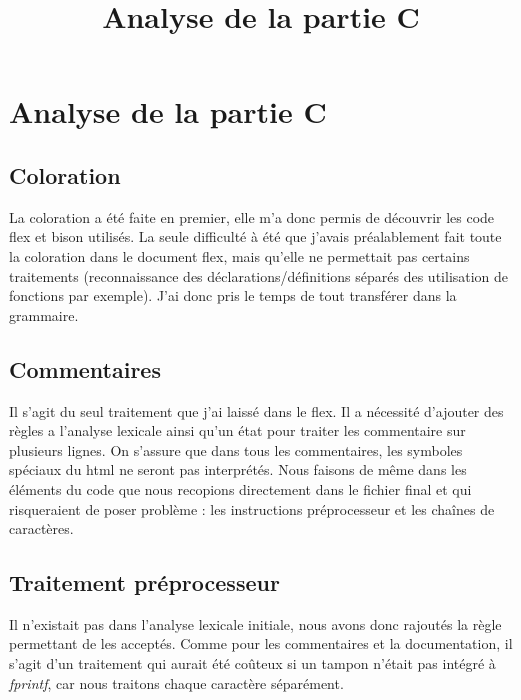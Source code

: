 \documentclass[10pt,a4paper]{report}
\begin{document}
\title{Analyse de la partie C}

\section{Analyse de la partie C}

\subsection{Coloration}
La coloration a été faite en premier, elle m'a donc permis de découvrir les code flex et bison utilisés. La seule difficulté à été que j'avais préalablement fait toute la coloration dans le document flex, mais qu'elle ne permettait pas certains traitements (reconnaissance des déclarations/définitions séparés des utilisation de fonctions par exemple). J'ai donc pris le temps de tout transférer dans la grammaire. 

\subsection{Commentaires}
Il s'agit du seul traitement que j'ai laissé dans le flex. Il a nécessité d'ajouter des règles a l'analyse lexicale ainsi qu'un état pour traiter les commentaire sur plusieurs lignes. \newline
On s'assure que dans tous les commentaires, les symboles spéciaux du html ne seront pas interprétés. Nous faisons de même dans les éléments du code que nous recopions directement dans le fichier final et qui risqueraient de poser problème : les instructions préprocesseur et les chaînes de caractères.

\subsection{Traitement préprocesseur}
Il n'existait pas dans l'analyse lexicale initiale, nous avons donc rajoutés la règle permettant de les acceptés. Comme pour les commentaires et la documentation, il s'agit d'un traitement qui aurait été coûteux si un tampon n'était pas intégré à \textit{fprintf}, car nous traitons chaque caractère séparément. 
\end{document}

